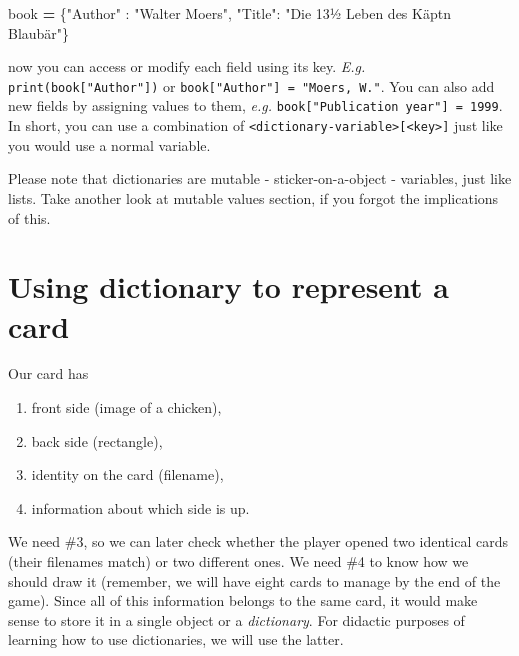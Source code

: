 \documentclass[
]{book}
\newenvironment{Shaded}{\begin{snugshade}}{\end{snugshade}}
\newcommand{\NormalTok}[1]{#1}
\newcommand{\OperatorTok}[1]{\textcolor[rgb]{0.81,0.36,0.00}{\textbf{#1}}}
\newcommand{\StringTok}[1]{\textcolor[rgb]{0.31,0.60,0.02}{#1}}
\providecommand{\tightlist}{%
  \setlength{\itemsep}{0pt}\setlength{\parskip}{0pt}}
\begin{document}
\begin{Shaded}
\begin{Highlighting}[]
\NormalTok{book }\OperatorTok{=}\NormalTok{ \{}\StringTok{"Author"}\NormalTok{ : }\StringTok{"Walter Moers"}\NormalTok{, }\StringTok{"Title"}\NormalTok{: }\StringTok{"Die 13½ Leben des Käpt\textquotesingle{}n Blaubär"}\NormalTok{\}}
\end{Highlighting}
\end{Shaded}

now you can access or modify each field using its key. \emph{E.g.} \texttt{print(book{[}"Author"{]})} or \texttt{book{[}"Author"{]}\ =\ "Moers,\ W."}. You can also add new fields by assigning values to them, \emph{e.g.} \texttt{book{[}"Publication\ year"{]}\ =\ 1999}. In short, you can use a combination of \texttt{\textless{}dictionary-variable\textgreater{}{[}\textless{}key\textgreater{}{]}} just like you would use a normal variable.

Please note that dictionaries are mutable - sticker-on-a-object - variables, just like lists. Take another look at mutable values section, if you forgot the implications of this.

\hypertarget{using-dictionary-to-represent-a-card}{%
\section{Using dictionary to represent a card}\label{using-dictionary-to-represent-a-card}}

Our card has

\begin{enumerate}
\def\labelenumi{\arabic{enumi}.}
\tightlist
\item
  front side (image of a chicken),
\item
  back side (rectangle),
\item
  identity on the card (filename),
\item
  information about which side is up.
\end{enumerate}

We need \#3, so we can later check whether the player opened two identical cards (their filenames match) or two different ones. We need \#4 to know how we should draw it (remember, we will have eight cards to manage by the end of the game). Since all of this information belongs to the same card, it would make sense to store it in a single object or a \emph{dictionary}. For didactic purposes of learning how to use dictionaries, we will use the latter.
\end{document}
